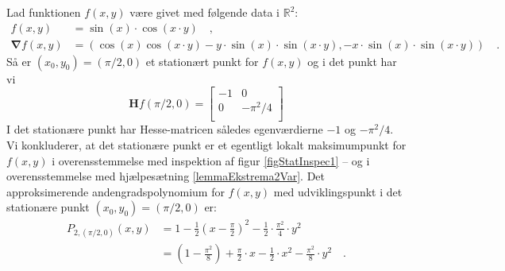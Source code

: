 \begin{example} \label{exampStatInspec1}
Lad funktionen $f(x,y)$ være givet med følgende data i $\mathbb{R}^{2}$:
\begin{equation}
\begin{aligned}
f(x,y) &= \sin(x)\cdot\cos(x\cdot y) \quad , \\
\bm{\nabla}f(x,y) &= \left(\cos(x)\cos(x\cdot y) - y\cdot \sin(x)\cdot\sin(x\cdot y), -x \cdot \sin(x)\cdot \sin(x \cdot y)  \right) \quad .
\end{aligned}
\end{equation}
Så er $(x_{0}, y_{0}) = (\pi/2, 0)$ et stationært punkt for $f(x,y)$ og i det punkt har vi
\begin{equation}
\mathbf{H}f(\pi/2, 0) = \left[
                                                                           \begin{array}{cc}
                                                                             -1 & 0 \\
                                                                             0 & -\pi^{2}/4\\
                                                                           \end{array}
                                                                         \right]
\end{equation}
I det stationære punkt har Hesse-matricen således egenværdierne $-1$ og $-\pi^{2}/4$. Vi konklu\-derer, at det stationære punkt er et egentligt lokalt maksimumpunkt for $f(x,y)$ i over\-ens\-stem\-mel\-se med inspektion af figur \ref{figStatInspec1} -- og i overensstemmelse med hjælpesætning \ref{lemmaEkstrema2Var}.
Det approksimerende andengradspolynomium for $f(x,y)$ med udviklingspunkt i det stationære punkt $(x_{0}, y_{0})= (\pi/2, 0)$ er:
\begin{equation}
\begin{aligned}
P_{2, (\pi/2, 0)}(x,y) &= 1 - \frac{1}{2} \left( x - \frac{\pi}{2} \right)^2 - \frac{1}{2} \cdot \frac{\pi^{2}}{4} \cdot y^2 \\
&= \left(1 - \frac{\pi^{2}}{8}\right) + \frac{\pi}{2}\cdot x - \frac{1}{2}\cdot x^{2}  - \frac{\pi^{2}}{8} \cdot y^{2} \quad.
\end{aligned}
\end{equation}
\end{example}


